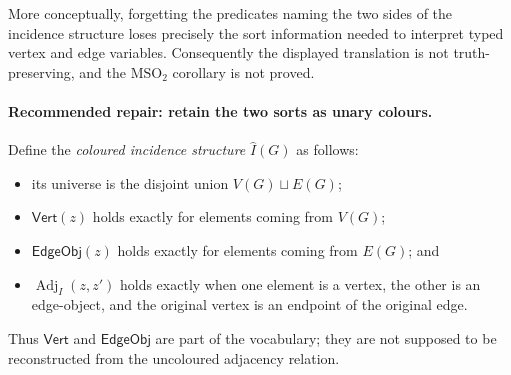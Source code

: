 \documentclass[11pt]{article}
\newcommand{\MSOtwo}{\ensuremath{\mathrm{MSO}_2}}
\begin{document}
More conceptually, forgetting the predicates naming the two sides of the
incidence structure loses precisely the sort information needed to interpret
typed vertex and edge variables.  Consequently the displayed translation is
not truth-preserving, and the \MSOtwo{} corollary is not proved.

\paragraph{Recommended repair: retain the two sorts as unary colours.}
Define the \emph{coloured incidence structure} \(\widehat I(G)\) as follows:
\begin{itemize}[leftmargin=*]
  \item its universe is the disjoint union \(V(G)\sqcup E(G)\);
  \item \(\mathsf{Vert}(z)\) holds exactly for elements coming from \(V(G)\);
  \item \(\mathsf{EdgeObj}(z)\) holds exactly for elements coming from
    \(E(G)\); and
  \item \(\operatorname{Adj}_I(z,z')\) holds exactly when one element is a
    vertex, the other is an edge-object, and the original vertex is an endpoint
    of the original edge.
\end{itemize}
Thus \(\mathsf{Vert}\) and \(\mathsf{EdgeObj}\) are part of the vocabulary; they
are not supposed to be reconstructed from the uncoloured adjacency relation.
\end{document}
